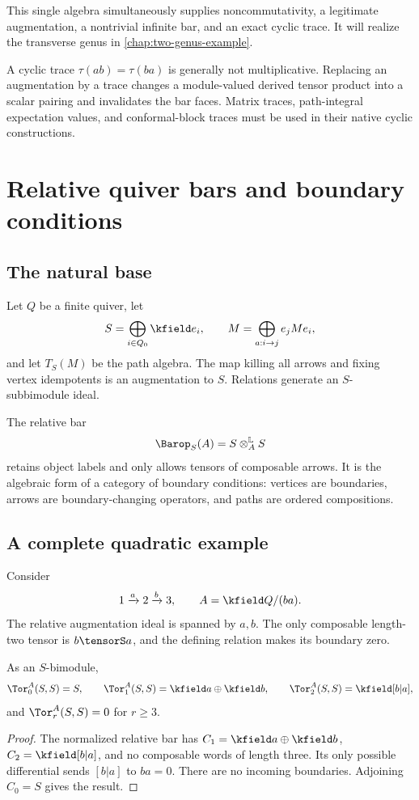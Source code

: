This single algebra simultaneously supplies noncommutativity, a legitimate augmentation, a nontrivial infinite bar, and an exact cyclic trace.  It will realize the transverse genus in \cref{chap:two-genus-example}.

\begin{nogobox}[title={No-go theorem 13: a trace is not an augmentation}]
A cyclic trace \(\tau(ab)=\tau(ba)\) is generally not multiplicative.  Replacing an augmentation by a trace changes a module-valued derived tensor product into a scalar pairing and invalidates the bar faces.  Matrix traces, path-integral expectation values, and conformal-block traces must be used in their native cyclic constructions.
\end{nogobox}

\chapter{Relative quiver bars and boundary conditions}\label{chap:quiver}

\section{The natural base}
Let \(Q\) be a finite quiver, let
\[
 S=\bigoplus_{i\in Q_0}\kfield e_i,
 \qquad
 M=\bigoplus_{a:i\to j}e_jMe_i,
\]
and let \(T_S(M)\) be the path algebra.  The map killing all arrows and fixing vertex idempotents is an augmentation to \(S\).  Relations generate an \(S\)-subbimodule ideal.

The relative bar
\[
 \Barop_S(A)=S\otimes_A^{\mathbb L}S
\]
retains object labels and only allows tensors of composable arrows.  It is the algebraic form of a category of boundary conditions: vertices are boundaries, arrows are boundary-changing operators, and paths are ordered compositions.

\section{A complete quadratic example}
Consider
\[
 1\xrightarrow{a}2\xrightarrow{b}3,
 \qquad
 A=\kfield Q/(ba).
\]
The relative augmentation ideal is spanned by \(a,b\).  The only composable length-two tensor is \(b\tensorS a\), and the defining relation makes its boundary zero.

\begin{theorem}\label{thm:quiver-bar}
As an \(S\)-bimodule,
\[
 \Tor_0^A(S,S)=S,
 \qquad
 \Tor_1^A(S,S)=\kfield a\oplus\kfield b,
 \qquad
 \Tor_2^A(S,S)=\kfield[b|a],
\]
and \(\Tor_r^A(S,S)=0\) for \(r\ge3\).
\end{theorem}
\begin{proof}
The normalized relative bar has \(C_1=\kfield a\oplus\kfield b\), \(C_2=\kfield[b|a]\), and no composable words of length three.  Its only possible differential sends \([b|a]\) to \(ba=0\).  There are no incoming boundaries.  Adjoining \(C_0=S\) gives the result.
\end{proof}

